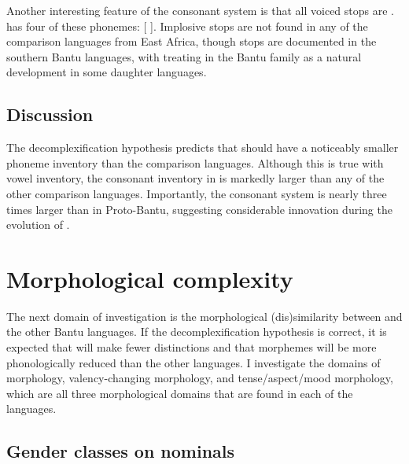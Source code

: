 \documentclass[output=paper,
modfonts
]{langscibook}
\begin{document}
	
  Another interesting feature of the  consonant system is that all voiced stops are .  has four of these phonemes: [  ]. Implosive stops are not found in any of the comparison languages from East Africa, though  stops are documented in the southern Bantu languages, with \citet{Maddieson2003} treating  in the Bantu family as a natural development in some daughter languages.

\subsection{Discussion} 
The decomplexification hypothesis predicts that  should have a noticeably smaller phoneme inventory than the comparison languages. Although this is true with vowel inventory, the consonant inventory in  is markedly larger than any of the other comparison languages. Importantly, the  consonant system is nearly three times larger than in Proto-Bantu, suggesting considerable innovation during the evolution of . 
  
 


  
\section{Morphological complexity}\label{sec:5:jerro}

The next domain of investigation is the morphological (dis)similarity between  and the other Bantu languages. If the decomplexification hypothesis is correct, it is expected that  will make fewer distinctions and that morphemes will be more phonologically reduced than the other languages. I investigate the domains of  morphology, valency-changing morphology, and tense/aspect/mood morphology, which are all three morphological domains that are found in each of the languages. 

\subsection{Gender classes on nominals}%
\end{document}
